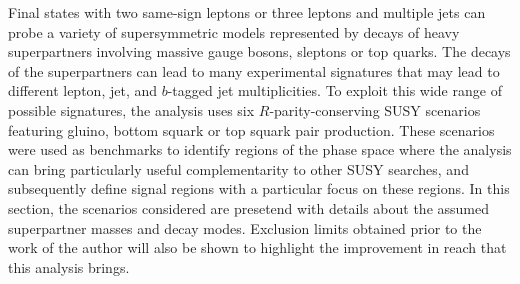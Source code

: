 
Final states with two same-sign leptons or three leptons and multiple jets can probe a variety of supersymmetric models 
represented by decays of heavy superpartners involving massive gauge bosons, sleptons or top quarks. 
The decays of the superpartners can lead to many experimental signatures that may lead to different lepton, jet, and $b$-tagged jet multiplicities.
To exploit this wide range of possible signatures, the analysis uses six $R$-parity-conserving SUSY scenarios 
featuring gluino, bottom squark or top squark pair production. 
These scenarios were used as benchmarks to identify regions of the phase space 
where the analysis can bring particularly useful complementarity to other SUSY 
searches, 
and subsequently define signal regions with a particular focus on these 
regions. 
In this section, the scenarios considered are presetend with details about 
the assumed superpartner masses and decay modes.  
Exclusion limits obtained prior to the work of the author will also 
be shown to highlight the improvement in reach that this analysis brings.

